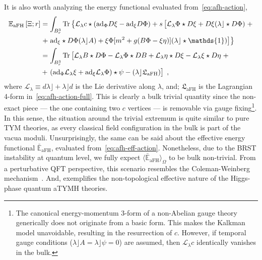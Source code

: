 \documentclass[../main.tex]{subfiles}
\begin{document}
It is also worth analyzing the energy functional evaluated from~\eqref{eq:afh-action},
\begin{subequations}%
  \label{eq:afh-energy}
  \begin{align}
    \mathbb{E}_{\text{aFH}} \left[ \Xi ; r\right] & =  \int_{B^3_r} \tr \left\{ \mathcal{L}_{\lambda}c \star ( \mathrm{ad}_{\Phi} D \xi - \mathrm{ad}_{\xi} D \Phi) + s \left[ \vphantom{m^2} \mathcal{L}_{\lambda} \Phi \star D \xi + D \xi (\lambda\rfloor \star D \Phi) \right. + \right. \nonumber \\
                                                                                                                                                                          & \left. + \left. \mathrm{ad}_\xi \star D \Phi (\lambda \rfloor A) + \xi \Phi [ m^{2} + g ( B \Phi - \xi \eta ) ] ( \lambda \rfloor \star \mathds{1} ) \right] \right\} \\
                                                  & =  \int_{B^3_r}\tr \left[ \vphantom{m^2} \mathcal{L}_{\lambda} B \star D \Phi - \mathcal{L}_{\lambda} \Phi \star DB + \mathcal{L}_{\lambda} \eta \star D \xi - \mathcal{L}_{\lambda} \xi \star D \eta \right. + \nonumber                          \\
                                                                         & + \left. ( \mathrm{ad}_{\Phi} \mathcal{L}_{\lambda} \xi + \mathrm{ad}_{\xi} \mathcal{L}_{\lambda} \Phi ) \star \psi - (\lambda \rfloor \mathfrak{L}_{\text{aFH}}) \vphantom{m^2} \right] \;,
  \end{align}
\end{subequations}
where $\mathcal{L}_{\lambda} \equiv d \lambda \rfloor + \lambda \rfloor d$ is the Lie derivative along $\lambda$, and; $\mathfrak{L}_{\text{aFH}}$ is the Lagrangian 4-form in~\eqref{eq:afh-action-full}. This is clearly a bulk trivial quantity since the non-exact piece --- the one containing two $c$ vertices --- is removable via gauge fixing\footnote{The canonical energy-momentum 3-form of a non-Abelian gauge theory generically does not originate from a basic form. This makes the Kalkman model unavoidable, resulting in the resurrection of $c$. However, if temporal gauge conditions ($\lambda \rfloor A = \lambda \rfloor \psi =0$) are assumed, then $\mathcal{L}_{\lambda}c$ identically vanishes in the bulk.}. In this sense, the situation around the trivial extremum is quite similar to pure TYM theories, as every classical field configuration in the bulk is part of the vacua moduli. Unsurprisingly, the same can be said about the effective energy functional $\bar{\mathbb{E}}_{\text{aFH}}$, evaluated from~\eqref{eq:afh-eff-action}. Nonetheless, due to the BRST instability at quantum level, we fully expect $\langle \bar{\mathbb{E}}_{\text{aFH}}\rangle_{\Omega}$ to be bulk non-trivial. From a perturbative QFT perspective, this scenario resembles the Coleman-Weinberg mechanism~\cite{coleman1973a}. And, exemplifies the non-topological effective nature of the Higgs-phase quantum aTYMH theories.
\end{document}
